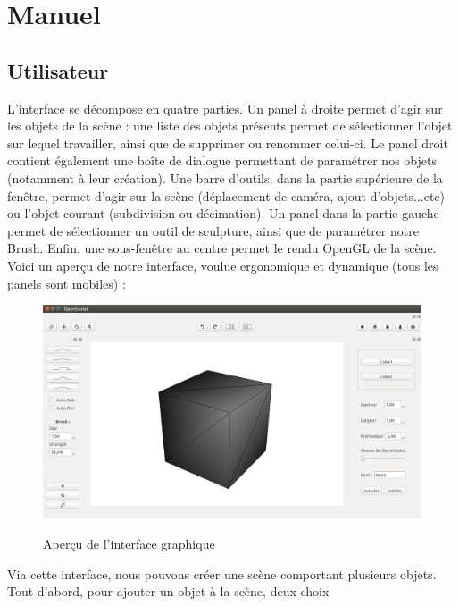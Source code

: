 \documentclass[a4paper]{memoir}
\begin{document}
	\chapter{Manuel}
		
		\section{Utilisateur}

			L'interface se décompose en quatre parties. Un panel à droite permet d'agir sur les objets de la scène : une liste des objets présents permet de 
			sélectionner l'objet sur lequel travailler, ainsi que de supprimer ou renommer celui-ci. Le panel droit contient également une boîte de dialogue 
			permettant de paramétrer nos objets (notamment à leur création). Une barre d'outils, dans la partie supérieure de la fenêtre, permet d'agir 
			sur la scène (déplacement de caméra, ajout d'objets...etc) ou l'objet courant (subdivision ou décimation). Un panel dans la partie gauche permet 
			de sélectionner un outil de sculpture, ainsi que de paramétrer notre Brush. Enfin, une sous-fenêtre au centre permet le rendu OpenGL de la scène.
			\\Voici un aperçu de notre interface, voulue ergonomique et dynamique (tous les panels sont mobiles) :
			\begin{figure}[H]
				\begin{center}
					\includegraphics[scale=0.27]{img/interface.png}
					\label{fig:interface}
					\caption{Aperçu de l'interface graphique}
				\end{center}
			\end{figure}
			Via cette interface, nous pouvons créer une scène comportant plusieurs objets. Tout d'abord, pour ajouter un objet à la scène, deux choix 
\end{document}
